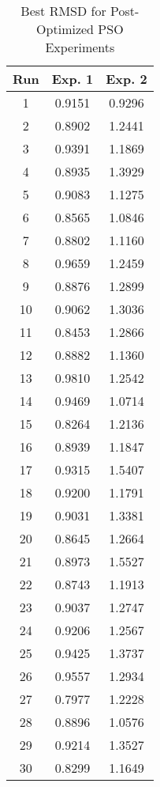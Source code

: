 \begin{table}
	\centering
	\begin{tabular}{ | c | c | c | }
		\hline
		Run & Exp. 1 & Exp. 2 \\ \hline
		1 & 0.9151 & 0.9296 \\ \hline
		2 & 0.8902 & 1.2441 \\ \hline
		3 & 0.9391 & 1.1869 \\ \hline
		4 & 0.8935 & 1.3929 \\ \hline
		5 & 0.9083 & 1.1275 \\ \hline
		6 & 0.8565 & 1.0846 \\ \hline
		7 & 0.8802 & 1.1160 \\ \hline
		8 & 0.9659 & 1.2459 \\ \hline
		9 & 0.8876 & 1.2899 \\ \hline
		10 & 0.9062 & 1.3036 \\ \hline
		11 & 0.8453 & 1.2866 \\ \hline
		12 & 0.8882 & 1.1360 \\ \hline
		13 & 0.9810 & 1.2542 \\ \hline
		14 & 0.9469 & 1.0714 \\ \hline
		15 & 0.8264 & 1.2136 \\ \hline
		16 & 0.8939 & 1.1847 \\ \hline
		17 & 0.9315 & 1.5407 \\ \hline
		18 & 0.9200 & 1.1791 \\ \hline
		19 & 0.9031 & 1.3381 \\ \hline
		20 & 0.8645 & 1.2664 \\ \hline
		21 & 0.8973 & 1.5527 \\ \hline
		22 & 0.8743 & 1.1913 \\ \hline
		23 & 0.9037 & 1.2747 \\ \hline
		24 & 0.9206 & 1.2567 \\ \hline
		25 & 0.9425 & 1.3737 \\ \hline
		26 & 0.9557 & 1.2934 \\ \hline
		27 & 0.7977 & 1.2228 \\ \hline
		28 & 0.8896 & 1.0576 \\ \hline
		29 & 0.9214 & 1.3527 \\ \hline
		30 & 0.8299 & 1.1649 \\ \hline
	\end{tabular}
	\caption{Best RMSD for Post-Optimized PSO Experiments}
\end{table}

